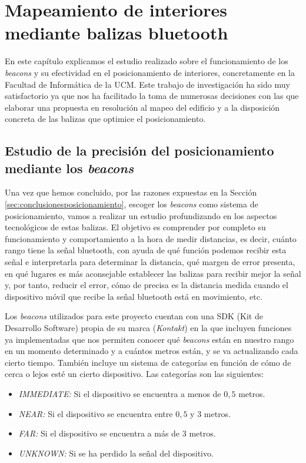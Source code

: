 \chapter{Mapeamiento de interiores mediante balizas bluetooth}
\label{cap:descripcionTrabajo}

En este capítulo explicamos el estudio realizado sobre el funcionamiento de los \textit{beacons} y su efectividad en el posicionamiento de interiores, concretamente en la Facultad de Informática de la UCM. Este trabajo de investigación ha sido muy satisfactorio ya que nos ha facilitado la toma de numerosas decisiones con las que elaborar una propuesta en resolución al mapeo del edificio y a la disposición concreta de las balizas que optimice el posicionamiento. 

\section{Estudio de la precisión del posicionamiento mediante los \textit{beacons}}

Una vez que hemos concluido, por las razones expuestas en la Sección \ref{sec:conclusionesposicionamiento}, escoger los \textit{beacons} como sistema de posicionamiento, vamos a realizar un estudio profundizando en los aspectos tecnológicos de estas balizas. El objetivo es comprender por completo su funcionamiento y comportamiento a la hora de medir distancias, es decir, cuánto rango tiene la señal bluetooth, con ayuda de qué función podemos recibir esta señal e interpretarla para determinar la distancia, qué margen de error presenta, en qué lugares es más aconsejable establecer las balizas para recibir mejor la señal y, por tanto, reducir el error, cómo de precisa es la distancia medida cuando el dispositivo móvil que recibe la señal bluetooth está en movimiento, etc. 

Los \textit{beacons} utilizados para este proyecto cuentan con una SDK (Kit de Desarrollo Software) propia de su marca (\textit{Kontakt}) en la que incluyen funciones ya implementadas que nos permiten conocer qué \textit{beacons} están en nuestro rango en un momento determinado y a cuántos metros están, y se va actualizando cada cierto tiempo. También incluye un sistema de categorías en función de cómo de cerca o lejos esté un cierto dispositivo. Las categorías son las siguientes:

\begin{itemize}
	\item \textit{IMMEDIATE:} Si el dispositivo se encuentra a menos de $0,5$ metros.
	\item \textit{NEAR:} Si el dispositivo se encuentra entre $0,5$ y $3$ metros.
	\item \textit{FAR:} Si el dispositivo se encuentra a más de $3$ metros.
	\item \textit{UNKNOWN:} Si se ha perdido la señal del dispositivo.
\end{itemize}

